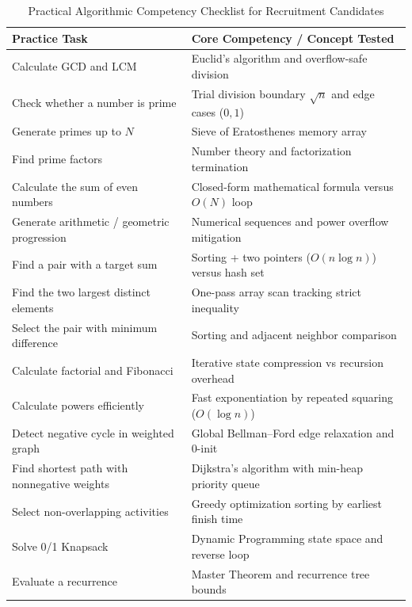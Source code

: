 \begin{table}[htbp]
\centering
\caption{Practical Algorithmic Competency Checklist for Recruitment Candidates}
\label{tab:recruitment_checklist}
\begin{tabularx}{\textwidth}{p{6.5cm} X}
\toprule
\textbf{Practice Task} & \textbf{Core Competency / Concept Tested} \\
\midrule
Calculate GCD and LCM & Euclid's algorithm and overflow-safe division \\
Check whether a number is prime & Trial division boundary $\sqrt{n}$ and edge cases ($0, 1$) \\
Generate primes up to $N$ & Sieve of Eratosthenes memory array \\
Find prime factors & Number theory and factorization termination \\
Calculate the sum of even numbers & Closed-form mathematical formula versus $O(N)$ loop \\
Generate arithmetic / geometric progression & Numerical sequences and power overflow mitigation \\
Find a pair with a target sum & Sorting + two pointers ($O(n\log n)$) versus hash set \\
Find the two largest distinct elements & One-pass array scan tracking strict inequality \\
Select the pair with minimum difference & Sorting and adjacent neighbor comparison \\
Calculate factorial and Fibonacci & Iterative state compression vs recursion overhead \\
Calculate powers efficiently & Fast exponentiation by repeated squaring ($O(\log n)$) \\
Detect negative cycle in weighted graph & Global Bellman--Ford edge relaxation and 0-init \\
Find shortest path with nonnegative weights & Dijkstra's algorithm with min-heap priority queue \\
Select non-overlapping activities & Greedy optimization sorting by earliest finish time \\
Solve 0/1 Knapsack & Dynamic Programming state space and reverse loop \\
Evaluate a recurrence & Master Theorem and recurrence tree bounds \\
\bottomrule
\end{tabularx}
\end{table}
